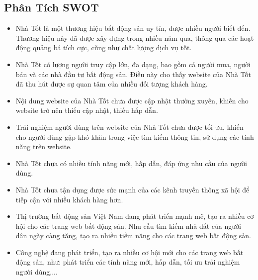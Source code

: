 \subsection{Phân Tích SWOT}
\begin{tcbraster}[raster columns=2, boxrule=0mm, arc=0mm]
\begin{tcolorbox}[equal height group=A, size=fbox, colback=swotS!60, colframe=swotS!80!black, title=\textsc{strengths}]
\begin{itemize}
\item Nhà Tốt là một thương hiệu bất động sản uy tín, được nhiều người biết đến. Thương hiệu này đã được xây dựng trong nhiều năm qua, thông qua các hoạt động quảng bá tích cực, cũng như chất lượng dịch vụ tốt.
\item Nhà Tốt có lượng người truy cập lớn, đa dạng, bao gồm cả người mua, người bán và các nhà đầu tư bất động sản. Điều này cho thấy website của Nhà Tốt đã thu hút được sự quan tâm của nhiều đối tượng khách hàng.
\end{itemize}
\end{tcolorbox}
\begin{tcolorbox}[equal height group=A, size=fbox, colback=swotW!60, colframe=swotW!80!black, title=\textsc{weaknesses}]
\begin{itemize}
\item Nội dung website của Nhà Tốt chưa được cập nhật thường xuyên, khiến cho website trở nên thiếu cập nhật, thiếu hấp dẫn.
\item Trải nghiệm người dùng trên website của Nhà Tốt chưa được tối ưu, khiến cho người dùng gặp khó khăn trong việc tìm kiếm thông tin, sử dụng các tính năng trên website.
\item Nhà Tốt chưa có nhiều tính năng mới, hấp dẫn, đáp ứng nhu cầu của người dùng.
\item Nhà Tốt chưa tận dụng được sức mạnh của các kênh truyền thông xã hội để tiếp cận với nhiều khách hàng hơn.
\end{itemize}
\end{tcolorbox}
\begin{tcolorbox}[equal height group=B, size=fbox, colback=swotO!60, colframe=swotO!80!black, title=\textsc{opportunities}]
\begin{itemize}
\item Thị trường bất động sản Việt Nam đang phát triển mạnh mẽ, tạo ra nhiều cơ hội cho các trang web bất động sản. Nhu cầu tìm kiếm nhà đất của người dân ngày càng tăng, tạo ra nhiều tiềm năng cho các trang web bất động sản.
\item Công nghệ đang phát triển, tạo ra nhiều cơ hội mới cho các trang web bất động sản, như: phát triển các tính năng mới, hấp dẫn, tối ưu trải nghiệm người dùng,...

\end{itemize}
\end{tcolorbox}
\end{tcbraster}
